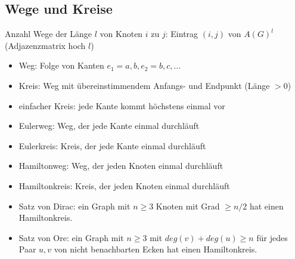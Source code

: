 \subsection{Wege und Kreise}

Anzahl Wege der Länge $l$ von Knoten $i$ zu $j$: Eintrag $(i,j)$ von $A(G)^l$ (Adjazenzmatrix hoch $l$)

\begin{itemize}
\item{Weg: Folge von Kanten $e_1={a,b},e_2={b,c},\dots$}
\item{Kreis: Weg mit übereinstimmendem Anfangs- und Endpunkt (Länge $>0$)}
\item{einfacher Kreis: jede Kante kommt höchstens einmal vor}
\item{Eulerweg: Weg, der jede Kante einmal durchläuft}
\item{Eulerkreis: Kreis, der jede Kante einmal durchläuft}
\item{Hamiltonweg: Weg, der jeden Knoten einmal durchläuft}
\item{Hamiltonkreis: Kreis, der jeden Knoten einmal durchläuft}
\item{Satz von Dirac: ein Graph mit $n \geq 3$ Knoten mit Grad $\geq n/2$ hat einen Hamiltonkreis.}
\item{Satz von Ore: ein Graph mit $n \geq 3$ mit ${deg}(v)+{deg(u) \geq n}$ für jedes Paar $u,v$ von nicht benachbarten Ecken hat einen Hamiltonkreis.}
\end{itemize}
